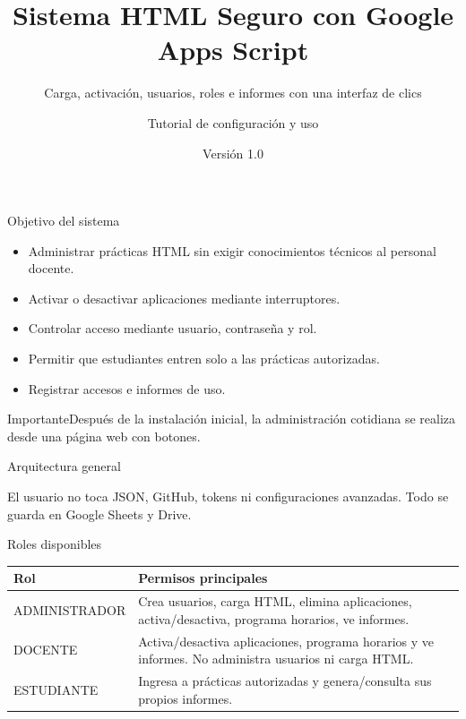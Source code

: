 \documentclass[aspectratio=169,11pt]{beamer}
\title[Sistema HTML Seguro]{Sistema HTML Seguro con Google Apps Script}
\subtitle{Carga, activación, usuarios, roles e informes con una interfaz de clics}
\author{Tutorial de configuración y uso}
\date{Versión 1.0}
\newcommand{\alertbox}[1]{\begin{block}{Importante}#1\end{block}}
\begin{document}
\begin{frame}
  \titlepage
\end{frame}

\begin{frame}{Objetivo del sistema}
\begin{itemize}
  \item Administrar prácticas HTML sin exigir conocimientos técnicos al personal docente.
  \item Activar o desactivar aplicaciones mediante interruptores.
  \item Controlar acceso mediante usuario, contraseña y rol.
  \item Permitir que estudiantes entren solo a las prácticas autorizadas.
  \item Registrar accesos e informes de uso.
\end{itemize}
\alertbox{Después de la instalación inicial, la administración cotidiana se realiza desde una página web con botones.}
\end{frame}

\begin{frame}{Arquitectura general}
\centering
{}
\vspace{.4cm}
\small El usuario no toca JSON, GitHub, tokens ni configuraciones avanzadas. Todo se guarda en Google Sheets y Drive.
\end{frame}

\begin{frame}{Roles disponibles}
\begin{tabular}{p{3cm}p{9.5cm}}
\toprule
\textbf{Rol} & \textbf{Permisos principales}\\
\midrule
ADMINISTRADOR & Crea usuarios, carga HTML, elimina aplicaciones, activa/desactiva, programa horarios, ve informes.\\
DOCENTE & Activa/desactiva aplicaciones, programa horarios y ve informes. No administra usuarios ni carga HTML.\\
ESTUDIANTE & Ingresa a prácticas autorizadas y genera/consulta sus propios informes.\\
\bottomrule
\end{tabular}
\end{frame}
\end{document}
